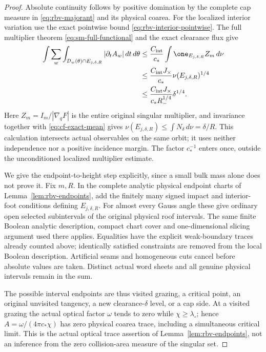 \begin{proof}
Absolute continuity follows by positive domination by the complete
cap measure in \eqref{eq:rbv-majorant} and its physical coarea.
For the localized interior variation use the exact pointwise bound
\eqref{eq:rbv-interior-pointwise}.  The full multiplier theorem
\eqref{eq:sm-full-functional} and the exact clearance flux give
\begin{align*}
 \int\sum_w\int_{\mathcal D_w(\theta)\cap E_{j,\delta,R}}
                 |\partial_t A_w|\,dt\,d\theta
 &\le\frac{C_{\rm int}}{c_*}
                   \int \one_{E_{j,\delta,R}}Z_m\,d\nu\\
 &\le\frac{C_{\rm int}J_\times}{c_*}
                            \nu(E_{j,\delta,R})^{1/4}\\
 &\le\frac{C_{\rm int}J_\times}{c_*R_-^{1/4}}\delta^{1/4}.
\end{align*}
Here $Z_m=I_m/|\nabla_qF|$ is the entire original singular
multiplier, and invariance together with
\eqref{eq:cf-exact-mean} gives
$\nu(E_{j,\delta,R})\le\int N_\delta\,d\nu=\delta/R$.
This calculation intersects actual observables on the same orbit;
it uses neither independence nor a positive incidence margin.
The factor $c_*^{-1}$ enters once, outside the unconditioned
localized multiplier estimate.

We give the endpoint-to-height step explicitly, since a small bulk
mass alone does not prove it.  Fix $m,R$.  In the complete analytic
physical endpoint charts of Lemma~\ref{lem:rbv-endpoints}, add the
finitely many signed impact and interior-foot conditions defining
$E_{j,\delta,R}$.  For almost every Gauss angle these give ordinary
open selected subintervals of the original physical roof intervals.
The same finite Boolean analytic description, compact chart cover
and one-dimensional slicing argument used there applies.  Equalities
have the explicit weak-boundary traces already counted above;
identically satisfied constraints are removed from the local
Boolean description.  Artificial seams and homogeneous cuts cancel
before absolute values are taken.  Distinct actual word sheets and
all genuine physical intervals remain in the sum.

The possible interval endpoints are thus visited grazing, a critical
point, an original unvisited tangency, a new clearance-$\delta$
level, or a cap side.  At a visited grazing the actual optical
factor $\omega$ tends to zero while $\chi\ge\lambda_\circ$;
hence $A=\omega/(4\pi c_*\chi)$ has zero physical coarea trace,
including a simultaneous critical limit.  This is the actual optical
trace assertion of Lemma~\ref{lem:rbv-endpoints}, not an inference
from the zero collision-area measure of the singular set.


\end{proof}
